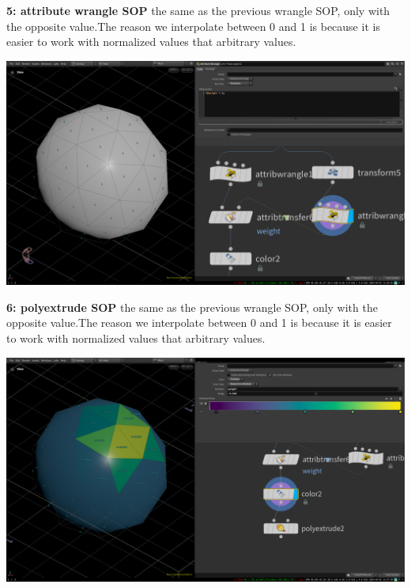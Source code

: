 \documentclass[11pt, a4paper, twoside]{article}
\begin{document}
	\begin{minipage}[H]{0.4\textwidth}
		\textbf{5: attribute wrangle SOP}\newline 
the same as the previous wrangle SOP, only with the opposite value.The reason
we interpolate between 0 and 1 is because it is easier to work with normalized
values that arbitrary values. 
	
	\end{minipage}
	\vspace{1pt}
	\begin{minipage}[H]{0.6\textwidth}
		\includegraphics[width=1\textwidth]{media/houdini_fundamentals_5.png}
	\end{minipage}


	\begin{minipage}[H]{0.4\textwidth}
		\textbf{6: polyextrude SOP}\newline 
the same as the previous wrangle SOP, only with the opposite value.The reason
we interpolate between 0 and 1 is because it is easier to work with normalized
values that arbitrary values. 
	
	\end{minipage}
	\vspace{1pt}
	\begin{minipage}[H]{0.6\textwidth}
		\includegraphics[width=1\textwidth]{media/houdini_fundamentals_6.png}
	\end{minipage}
\end{document}
